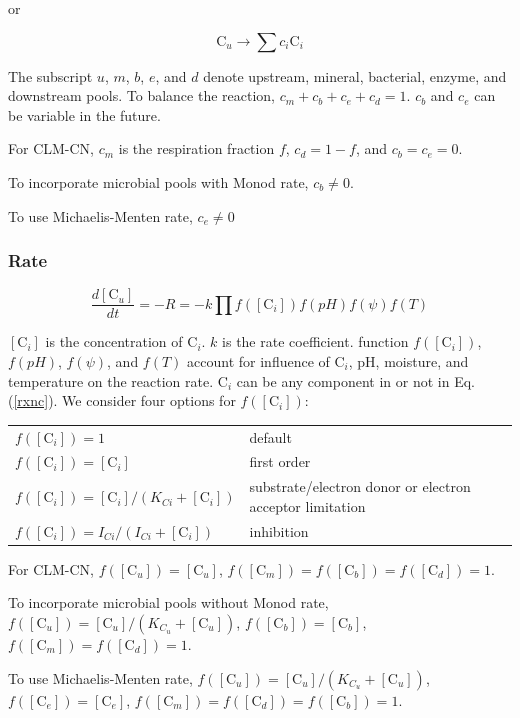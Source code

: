 \documentclass[12pt, a4paper]{article}
\begin{document}
or

\begin{equation}
\text{C}_u \rightarrow \sum c_i\text{C}_i
\end{equation}

The subscript $u$, $m$, $b$, $e$, and $d$ denote upstream, mineral, bacterial, enzyme, and downstream pools. To balance the reaction, $c_m + c_b + c_e + c_d = 1$. $c_b$ and $c_e$ can be variable in the future.

For CLM-CN, $c_m$ is the respiration fraction $f$, $c_d = 1 - f$, and $c_b = c_e = 0$.

To incorporate microbial pools with Monod rate, $c_b \neq 0$.

To use Michaelis-Menten rate, $c_e \neq 0$

\subsubsection{Rate}
\begin{equation}
\label{ratec}
\frac{d[\text{C}_u]}{dt} = -R = -k \prod f([\text{C}_i]) f(pH)f(\psi)f(T)
\end{equation}

$[\text{C}_i]$ is the concentration of C$_i$. $k$ is the rate coefficient. function $f([\text{C}_i])$, $f(pH)$, $f(\psi)$, and $f(T)$ account for influence of $\text{C}_i$, pH, moisture, and temperature on the reaction rate. $\text{C}_i$ can be any component in or not in Eq. (\ref{rxnc}). We consider four options for $f([\text{C}_i])$:

\begin{tabular}{llll}
$f([\text{C}_i]) = 1$ & default \\
$f([\text{C}_i]) = [\text{C}_i]$ & first order \\
$f([\text{C}_i]) = [\text{C}_i]/(K_{Ci} + [\text{C}_i])$ & substrate/electron donor or electron acceptor limitation \\
$f([\text{C}_i]) = I_{Ci}/(I_{Ci} + [\text{C}_i])$ & inhibition \\
\end{tabular}

For CLM-CN, $f([\text{C}_u])=[\text{C}_u]$,  $f([\text{C}_m])=f([\text{C}_b])=f([\text{C}_d]) = 1$.

To incorporate microbial pools without Monod rate, $f([\text{C}_u])=[\text{C}_u]/(K_{C_u}+[\text{C}_u])$, $f([\text{C}_b])=[\text{C}_b]$,  $f([\text{C}_m])=f([\text{C}_d]) = 1$.

To use Michaelis-Menten rate, $f([\text{C}_u])=[\text{C}_u]/(K_{C_u}+[\text{C}_u])$, $f([\text{C}_e])=[\text{C}_e]$,  $f([\text{C}_m])=f([\text{C}_d]) = f([\text{C}_b])= 1$.
\end{document}
